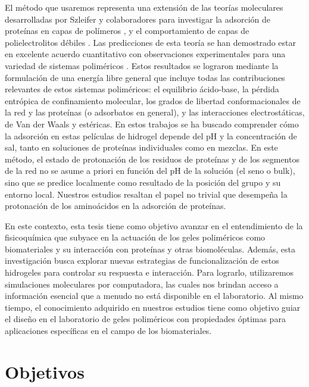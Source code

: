 El m\'etodo que usaremos representa una extensi\'on de las teor\'ias moleculares desarrolladas por Szleifer y colaboradores para investigar la adsorci\'on de prote\'inas en capas de pol\'imeros \cite{hagemann2018use,szleifer1997protein,fang2005kinetics}, y el comportamiento de capas de polielectrolitos d\'ebiles \cite{nap2006weak}. Las predicciones de esta teor\'ia se han demostrado estar en excelente acuerdo cuantitativo con observaciones experimentales para una variedad de sistemas polim\'ericos \cite{tagliazucchi2010responsive,wu2007behavior}.
Estos resultados se lograron mediante la formulaci\'on de una energ\'ia libre general que incluye todas las contribuciones relevantes de estos sistemas polim\'ericos: el equilibrio \'acido-base, la p\'erdida entr\'opica de confinamiento molecular, los grados de libertad conformacionales de la red y las prote\'inas (o adsorbatos en general), y las interacciones electrost\'aticas, de Van der Waals y est\'ericas. En estos trabajos se ha buscado comprender c\'omo la adsorci\'on en estas pel\'iculas de hidrogel depende del pH y la concentraci\'on de sal, tanto en soluciones de prote\'inas individuales como en mezclas. En este m\'etodo, el estado de protonaci\'on de los residuos de prote\'inas y de los segmentos de la red no se asume a priori en funci\'on del pH de la soluci\'on (el seno o bulk), sino que se predice localmente como resultado de la posici\'on del grupo y su entorno local. Nuestros estudios resaltan el papel no trivial que desempe\~na la protonaci\'on de los amino\'acidos en la adsorci\'on de prote\'inas. 


En este contexto, esta tesis tiene como objetivo avanzar en el entendimiento de la fisicoqu\'imica que subyace en la actuaci\'on de los geles polim\'ericos como biomateriales y su interacci\'on con prote\'inas y otras biomol\'eculas. Adem\'as, esta investigaci\'on busca explorar nuevas estrategias de funcionalizaci\'on de estos hidrogeles para controlar su respuesta e interacci\'on. Para lograrlo, utilizaremos simulaciones moleculares por computadora, las cuales nos brindan acceso a informaci\'on esencial que a menudo no est\'a disponible en el laboratorio. Al mismo tiempo, el conocimiento adquirido en nuestros estudios tiene como objetivo guiar el dise\~no en el laboratorio de geles polim\'ericos con propiedades \'optimas para aplicaciones espec\'ificas en el campo de los biomateriales.

\section{Objetivos}

